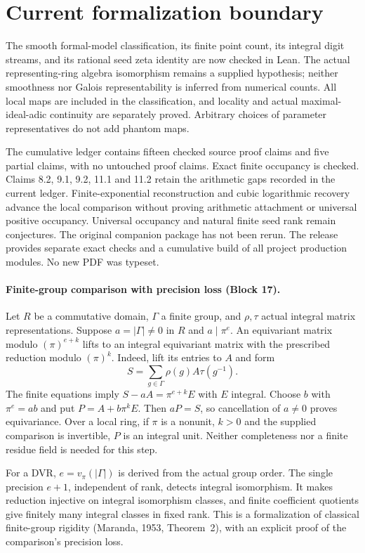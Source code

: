 \documentclass[11pt]{article}
\theoremstyle{definition}
\theoremstyle{remark}
\begin{document}
\section*{Current formalization boundary}
The smooth formal-model classification, its finite point count, its integral digit streams, and its rational seed zeta identity are now checked in Lean. The actual representing-ring algebra isomorphism remains a supplied hypothesis; neither smoothness nor Galois representability is inferred from numerical counts. All local maps are included in the classification, and locality and actual maximal-ideal-adic continuity are separately proved. Arbitrary choices of parameter representatives do not add phantom maps.

The cumulative ledger contains fifteen checked source proof claims and five partial claims, with no untouched proof claims. Exact finite occupancy is checked. Claims 8.2, 9.1, 9.2, 11.1 and 11.2 retain the arithmetic gaps recorded in the current ledger. Finite-exponential reconstruction and cubic logarithmic recovery advance the local comparison without proving arithmetic attachment or universal positive occupancy. Universal occupancy and natural finite seed rank remain conjectures. The original companion package has not been rerun. The release provides separate exact checks and a cumulative build of all project production modules. No new PDF was typeset.


\paragraph{Finite-group comparison with precision loss (Block 17).}
Let $R$ be a commutative domain, $\Gamma$ a finite group, and $\rho,\tau$
actual integral matrix representations. Suppose $a=|\Gamma|\ne0$ in $R$ and
$a\mid\pi^e$. An equivariant matrix modulo $(\pi)^{e+k}$ lifts to an
integral equivariant matrix with the prescribed reduction modulo $(\pi)^k$.
Indeed, lift its entries to $A$ and form
\[
S=\sum_{g\in\Gamma}\rho(g)A\tau(g^{-1}).
\]
The finite equations imply $S-aA=\pi^{e+k}E$ with $E$ integral. Choose $b$
with $\pi^e=ab$ and put $P=A+b\pi^kE$. Then $aP=S$, so cancellation of
$a\ne0$ proves equivariance. Over a local ring, if $\pi$ is a nonunit,
$k>0$ and the supplied comparison is invertible, $P$ is an integral unit.
Neither completeness nor a finite residue field is needed for this step.

For a DVR, $e=v_\pi(|\Gamma|)$ is derived from the actual group order.
The single precision $e+1$, independent of rank, detects integral
isomorphism. It makes reduction injective on integral isomorphism classes,
and finite coefficient quotients give finitely many integral classes in
fixed rank. This is a formalization of classical finite-group rigidity
(Maranda, 1953, Theorem~2), with an explicit proof of the comparison's
precision loss.
\end{document}
